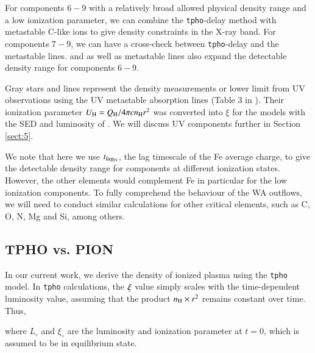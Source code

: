 \documentclass{aa}
\begin{document}
For components $6-9$ with a relatively broad allowed physical density range and a low ionization parameter,
we can combine the \texttt{tpho}-delay method with metastable C-like ions to give density constraints in the X-ray band.
For components $7-9$, we can have a cross-check between \texttt{tpho}-delay and the  metastable lines. 
 and  as well as  metastable lines also expand the detectable density range for components $6-9$.


Gray stars and lines represent the density measurements or lower limit from UV observations using the UV metastable absorption lines (Table $3$ in \citealp{Gabel2005ApJ}). 
Their ionization parameter $U_{\rm H} = Q_{\rm H} / 4 \pi c n_{\rm H} r^2$ was converted into $\xi$ for the models with the SED and luminosity of \cite{Mehdipour2017A&A}. 
We will discuss UV components further in Section \ref{sect:5}.


We note that here we use $t_{lag_{\rm Fe}}$, the lag timescale of the Fe average charge, to give the detectable density range for components at different ionization states.
However, the other elements would complement Fe in particular for the low ionization components.
To fully comprehend the behaviour of the WA outflows, we will need to conduct similar calculations for other critical elements, such as C, O, N, Mg and Si, among others.










\subsection{TPHO vs. PION}\label{subsect:TPHO vs. pion}





In our current work, we derive the density of ionized plasma using the \texttt{tpho} model.
In \texttt{tpho} calculations, the $\rm \xi$ value simply scales with the time-dependent luminosity value, assuming that the product $n_{\rm H} \times r^2$ remains constant over time. 
Thus, 

where $L_{\circ}$ and $\xi_{\circ}$ are the luminosity and ionization parameter at $t = 0$, which is assumed to be in equilibrium state.
\end{document}
